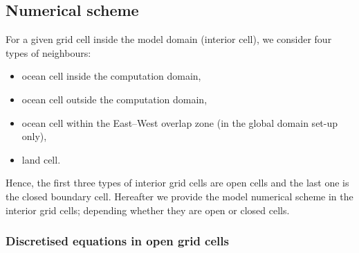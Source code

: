\subsection{Numerical scheme}

For a given grid cell inside the model domain (interior cell), we consider four types of neighbours:
\begin{itemize}
\item ocean cell inside the computation domain,
\item ocean cell outside the computation domain,
\item ocean cell within the East--West overlap zone (in the global domain set-up only),
\item land cell.
\end{itemize}
\vskip 10pt

\noindent Hence, the first three types of interior grid cells are open cells and the last one is the closed boundary cell. Hereafter we provide the model numerical scheme in the interior grid cells; depending whether they are open or closed cells.

\subsubsection{Discretised equations in open grid cells}

